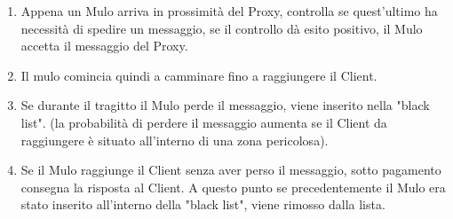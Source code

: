 \documentclass[13pt,a4paper]{article}
\begin{document}
\begin{enumerate}
	\item Appena un Mulo arriva in prossimità del Proxy, controlla se quest'ultimo ha necessità di spedire un messaggio, se il controllo dà esito positivo, il Mulo accetta il messaggio del Proxy.
	\item Il mulo comincia quindi a camminare fino a raggiungere il Client.
	\item Se durante il tragitto il Mulo perde il messaggio, viene inserito nella "black list". (la probabilità di perdere il messaggio aumenta se il Client da raggiungere è situato all'interno di una zona pericolosa).
	\item Se il Mulo raggiunge il Client senza aver perso il messaggio, sotto pagamento consegna la risposta al Client. A questo punto se precedentemente il Mulo era stato inserito all'interno della "black list", viene rimosso dalla lista.
\end{enumerate}
\end{document}
